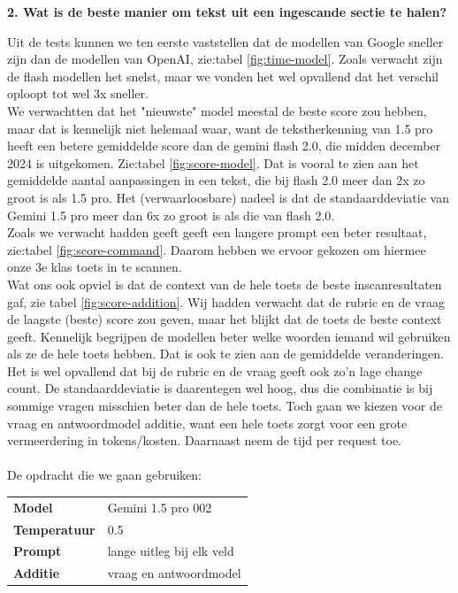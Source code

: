 \documentclass[12pt]{article}
\begin{document}
\pagebreak
\noindent\textbf{2. Wat is de beste manier om tekst uit een ingescande sectie te halen?}
\begin{multicols}{2}
Uit de tests kunnen we ten eerste vaststellen dat de modellen van Google sneller zijn dan de modellen van OpenAI, zie:tabel \ref{fig:time-model}. Zoals verwacht zijn de flash modellen het snelst, maar we vonden het wel opvallend dat het verschil oploopt tot wel 3x sneller. \\
\indent We verwachtten dat het "nieuwste" model meestal de beste score zou hebben, maar dat is kennelijk niet helemaal waar, want de tekstherkenning van 1.5 pro heeft een betere gemiddelde score dan de gemini flash 2.0, die midden december 2024 is uitgekomen. Zie:tabel \ref{fig:score-model}. Dat is vooral te zien aan het gemiddelde aantal aanpassingen in een tekst, die bij flash 2.0 meer dan 2x zo groot is als 1.5 pro. Het (verwaarloosbare) nadeel is dat de standaarddeviatie van Gemini 1.5 pro meer dan 6x zo groot is als die van flash 2.0. \\
\indent Zoals we verwacht hadden geeft geeft een langere prompt een beter resultaat, zie:tabel \ref{fig:score-command}. Daarom hebben we ervoor gekozen om hiermee onze 3e klas toets in te scannen. \\
\indent Wat ons ook opviel is dat de context van de hele toets de beste inscanresultaten gaf, zie tabel \ref{fig:score-addition}. Wij hadden verwacht dat de rubric en de vraag de laagste (beste) score zou geven, maar het blijkt dat de toets de beste context geeft. Kennelijk begrijpen de modellen beter welke woorden iemand wil gebruiken als ze de hele toets hebben. Dat is ook te zien aan de gemiddelde veranderingen. Het is wel opvallend dat bij de rubric en de vraag geeft ook zo'n lage change count. De standaarddeviatie is daarentegen wel hoog, dus die combinatie is bij sommige vragen misschien beter dan de hele toets. Toch gaan we kiezen voor de vraag en antwoordmodel additie, want een hele toets zorgt voor een grote vermeerdering in tokens/kosten. Daarnaast neem de tijd per request toe.\\
\\
\noindent De opdracht die we gaan gebruiken:\\
\begin{tabularx}{\textwidth}{ll}
    \textbf{Model} & Gemini 1.5 pro 002 \\
    \textbf{Temperatuur} & 0.5 \\
    \textbf{Prompt} & lange uitleg bij elk veld \\
    \textbf{Additie} & vraag en antwoordmodel \\
\end{tabularx}

\end{multicols}
\pagebreak
\end{document}
